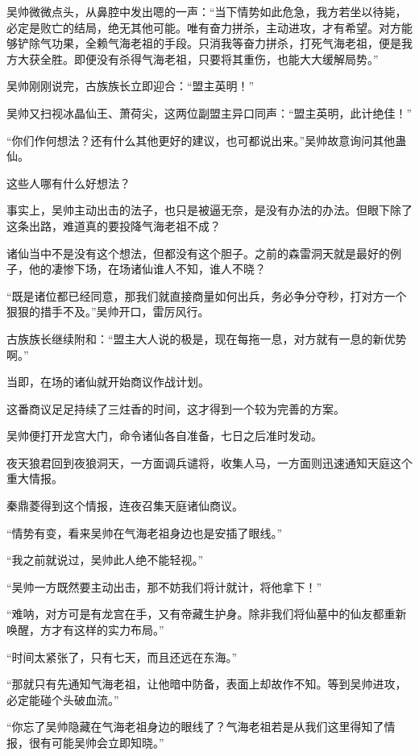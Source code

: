 \begin{this_body}
吴帅微微点头，从鼻腔中发出嗯的一声：“当下情势如此危急，我方若坐以待毙，必定是败亡的结局，绝无其他可能。唯有奋力拼杀，主动进攻，才有希望。对方能够铲除气功果，全赖气海老祖的手段。只消我等奋力拼杀，打死气海老祖，便是我方大获全胜。即便没有杀得气海老祖，只要将其重伤，也能大大缓解局势。”

吴帅刚刚说完，古族族长立即迎合：“盟主英明！”

吴帅又扫视冰晶仙王、萧荷尖，这两位副盟主异口同声：“盟主英明，此计绝佳！”

“你们作何想法？还有什么其他更好的建议，也可都说出来。”吴帅故意询问其他蛊仙。

这些人哪有什么好想法？

事实上，吴帅主动出击的法子，也只是被逼无奈，是没有办法的办法。但眼下除了这条出路，难道真的要投降气海老祖不成？

诸仙当中不是没有这个想法，但都没有这个胆子。之前的森雷洞天就是最好的例子，他的凄惨下场，在场诸仙谁人不知，谁人不晓？

“既是诸位都已经同意，那我们就直接商量如何出兵，务必争分夺秒，打对方一个狠狠的措手不及。”吴帅开口，雷厉风行。

古族族长继续附和：“盟主大人说的极是，现在每拖一息，对方就有一息的新优势啊。”

当即，在场的诸仙就开始商议作战计划。

这番商议足足持续了三炷香的时间，这才得到一个较为完善的方案。

吴帅便打开龙宫大门，命令诸仙各自准备，七日之后准时发动。

夜天狼君回到夜狼洞天，一方面调兵谴将，收集人马，一方面则迅速通知天庭这个重大情报。

秦鼎菱得到这个情报，连夜召集天庭诸仙商议。

“情势有变，看来吴帅在气海老祖身边也是安插了眼线。”

“我之前就说过，吴帅此人绝不能轻视。”

“吴帅一方既然要主动出击，那不妨我们将计就计，将他拿下！”

“难呐，对方可是有龙宫在手，又有帝藏生护身。除非我们将仙墓中的仙友都重新唤醒，方才有这样的实力布局。”

“时间太紧张了，只有七天，而且还远在东海。”

“那就只有先通知气海老祖，让他暗中防备，表面上却故作不知。等到吴帅进攻，必定能碰个头破血流。”

“你忘了吴帅隐藏在气海老祖身边的眼线了？气海老祖若是从我们这里得知了情报，很有可能吴帅会立即知晓。”


\end{this_body}
